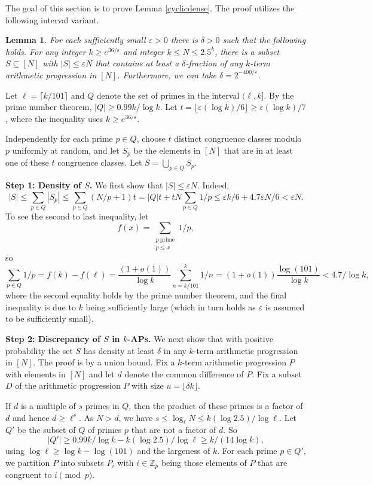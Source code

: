 \documentclass[11pt]{article}
\makeatletter
\numberwithin{equation}{section}
\renewenvironment{proof}[1][\proofname]{\par
  \vspace{-\topsep}%
  \pushQED{\qed}%
  \normalfont
  \topsep0pt \partopsep0pt %
  \trivlist
  \item[\hskip\labelsep
        \itshape
    #1\@addpunct{.}]\ignorespaces
}{%
  \popQED\endtrivlist\@endpefalse
  \addvspace{6pt plus 6pt} %
}
\newtheorem{lem}[result]{Lemma}
\theoremstyle{definition}
\theoremstyle{remark}
\makeatother
\begin{document}
The goal of this section is to prove Lemma \ref{cyclicdense}. The proof utilizes the following interval variant.

\begin{lem}\label{intervaldense}
For each sufficiently small $\varepsilon>0$ there is $\delta>0$ such that the following holds. For any integer $k \geq e^{36/\varepsilon}$ and integer $k \leq N \leq 2.5^k$, there is a subset $S \subseteq [N]$ with $|S| \leq \varepsilon N$ that contains at least a $\delta$-fraction of any $k$-term arithmetic progression in $[N]$. Furthermore, we can take $\delta =2^{-400/\varepsilon}$. 
\end{lem}
\begin{proof}
Let $\ell=\lceil k/101 \rceil$ and $Q$ denote the set of primes in the interval $(\ell,k]$. By the prime number theorem, $|Q| \geq 0.99k/\log k$. Let $t=\lfloor \varepsilon (\log k)/6\rfloor \geq \varepsilon (\log k)/7$, where the inequality uses $k \geq e^{36/\varepsilon}$. 

Independently for each prime $p \in Q$, choose $t$ distinct congruence classes modulo $p$ uniformly at random, and let $S_p$ be the elements in $[N]$ that are in at least one of these $t$ congruence classes. Let $S=\bigcup_{p \in Q} S_p$. 

{\bf Step 1: Density of $S$.} We first show that $|S| \leq \varepsilon N$. Indeed, $$|S|\le \sum_{p\in Q} |S_p|\le \sum_{p\in Q} (N/p+1)t = |Q|t+tN \sum_{p\in Q}1/p\le \varepsilon k /6+4.7\varepsilon N/6 < \varepsilon N.$$
To see the second to last inequality, let $$f(x)=\sum_{\substack{p~\textrm{prime} \\ p \leq x}} 1/p,$$ so $$\sum_{p \in Q} 1/p=f(k)-f(\ell)=\frac{(1+o(1))}{\log k}\sum_{n=k/101}^k 1/n = (1+o(1))\frac{\log(101)}{\log k}<4.7/\log k,$$ where the second equality holds by the prime number theorem, and the final inequality is due to $k$ being sufficiently large (which in turn holds as $\varepsilon$ is assumed to be sufficiently small).



{\bf Step 2: Discrepancy of $S$ in $k$-APs.} We next show that with positive probability the set $S$ has density at least $\delta$ in any $k$-term arithmetic progression in $[N]$. The proof is by a union bound. Fix a $k$-term arithmetic progression $P$ with elements in $[N]$ and let $d$ denote the common difference of $P$. Fix a subset $D$ of the arithmetic progression $P$ with size $u=\lfloor \delta k \rfloor$. 

If $d$ is a multiple of $s$ primes in $Q$, then the product of these primes is a factor of $d$ and hence $d \geq \ell^s$. As $N > d$, we have $s \leq \log_{\ell} N \leq k(\log 2.5)/\log \ell$. Let $Q'$ be the subset of $Q$ of primes $p$ that are not a factor of $d$. So $$|Q'| \geq 0.99k/\log k - k(\log 2.5)/\log \ell \geq k/(14\log k),$$using $\log\ell\ge\log k-\log(101)$ and the largeness of $k$. For each prime $p \in Q'$, we partition $P$ into subsets $P_i$ with $i \in \mathbb{Z}_p$ being those elements of $P$ that are congruent to $i \pmod p$. 


\end{proof}
\end{document}
